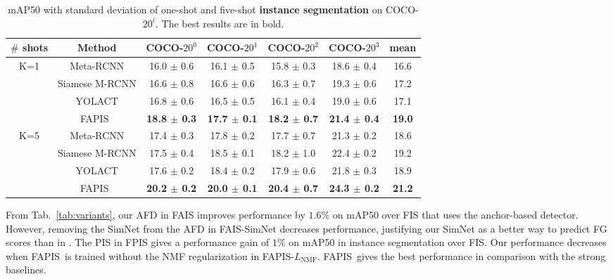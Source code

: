 \documentclass[final]{cvpr}
\def\Approach{FAPIS}
\begin{document}
\begin{table*}[]
\begin{center}
\small
\begin{tabular}{c|c|c|c|c|c|c}
\hline
\hline
\textbf{$\#$ shots} & \textbf{Method} & 
\textbf{COCO-$20^0$}      & \textbf{COCO-$20^1$}      & \textbf{COCO-$20^2$ }     & \textbf{COCO-$20^3$}      & mean  \\
\hline

\multirow{4}{*}{K=1} & Meta-RCNN \cite{yanICCV19metarcnn}        & 16.0 $\pm$ 0.6 & 16.1 $\pm$ 0.5 & 15.8 $\pm$ 0.3 & 18.6 $\pm$ 0.4 & 16.6 \\
& Siamese M-RCNN \cite{michaelis2018one} & 16.6 $\pm$ 0.8 & 16.6 $\pm$ 0.6 & 16.3 $\pm$ 0.7 & 19.3 $\pm$ 0.6 & 17.2 \\
& YOLACT \cite{bolya2019yolact}  &    16.8 $\pm$ 0.6 &  16.5 $\pm$ 0.5 & 16.1 $\pm$ 0.4 & 19.0 $\pm$ 0.6 & 17.1 \\
& \Approach~  &  \textbf{18.8 $\pm$ 0.3} &  \textbf{17.7 $\pm$ 0.1} & \textbf{18.2 $\pm$ 0.7} & \textbf{21.4 $\pm$ 0.4} & \textbf{19.0} \\

\hline 

\multirow{4}{*}{K=5} & Meta-RCNN \cite{yanICCV19metarcnn}        & 17.4 $\pm$ 0.3 & 17.8 $\pm$ 0.2 & 17.7 $\pm$ 0.7 & 21.3 $\pm$ 0.2 & 18.6 \\
& Siamese M-RCNN \cite{michaelis2018one} & 17.5 $\pm$ 0.4 & 18.5 $\pm$ 0.1 & 18.2 $\pm$ 1.0 & 22.4 $\pm$ 0.2 & 19.2 \\
& YOLACT \cite{bolya2019yolact} &  17.6 $\pm$ 0.2 & 18.4 $\pm$ 0.2 & 17.9 $\pm$ 0.6 & 21.8 $\pm$ 0.3 & 18.9 \\
& \Approach~ & \textbf{20.2 $\pm$ 0.2} & \textbf{20.0 $\pm$ 0.1} & \textbf{20.4 $\pm$ 0.7} & \textbf{24.3 $\pm$ 0.2} & \textbf{21.2}\\

\hline 
\hline
\end{tabular}
\end{center}
\vspace{-5pt}
\caption{mAP50 with standard deviation of one-shot and five-shot {\bf instance segmentation} on COCO-$20^i$. The best results are in bold.}
\label{tab:few_shot_seg}
\end{table*}



From Tab.~\ref{tab:variants}, our AFD in FAIS improves performance by $1.6\%$ on mAP50 over FIS that uses the anchor-based detector.  
However, removing the SimNet from the AFD in FAIS-SimNet decreases performance, justifying our SimNet as a better way to predict FG scores than in \cite{yanICCV19metarcnn,michaelis2018one}.
The PIS in FPIS gives a performance gain of $1\%$ on mAP50 in instance segmentation over FIS. Our performance decreases when \Approach~is trained without the NMF regularization in FAPIS-$L_{\text{NMF}}$. \Approach~gives the best performance in comparison with the strong baselines.
\end{document}
